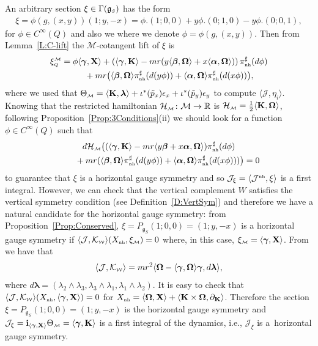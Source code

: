 \documentclass[10pt,a4paper]{amsart}
\numberwithin{equation}{section}
\def\W{\mathcal{W}}
\def\M{\mathcal{M}}
\def\J{\mathcal{J}}
\def\Ham{\mathcal{H}}
\def\R{\mathbb{R}}
\def\g{\mathfrak{g}}
\def\nh{{\mbox{\tiny{nh}}}}
\def\subW{{\mbox{\tiny{$\W$}}}}
\def\subM{{\mbox{\tiny{$\M$}}}}
\def\subSS{{\mbox{\tiny{$S$}}}}
\def\subQQ{{\mbox{\tiny{$Q$}}}}
\def\vecOm{\boldsymbol{\Omega}}
\def\vecL{\boldsymbol{\lambda}}
\def\vecgamma{\boldsymbol{\gamma}}
\def\vecalpha{\boldsymbol{\alpha}}
\def\vecbeta{\boldsymbol{\beta}}
\begin{document}
An arbitrary section $\xi\in \Gamma(\g_\subSS)$ has the form
\begin{gather*}
\xi = \phi(g,(x,y)) (1; y,-x)= \phi.(1;0,0) + y \phi. (0;1,0) - y \phi.(0;0,1),
\end{gather*}
for $\phi\in C^\infty(Q)$ and also we where we denote $\phi = \phi(g,(x,y))$.
Then from Lemma~\ref{L:C-lift} the $\M$-cotangent lift of $\xi$  is
\begin{gather*}
  \xi_\subQQ^\subM =     \phi \langle \vecgamma, {\bf X} \rangle  + \left(  \langle \vecgamma, {\bf K} \rangle -  mr(y \langle \vecbeta,\vecOm\rangle +  x\langle \vecalpha,\vecOm\rangle)  \right) \pi_\nh^\sharp (d\phi) \\
\hphantom{\xi_\subQQ^\subM = }{} + mr \big( \langle \vecbeta,\vecOm\rangle \pi_\nh^\sharp(d(y\phi)) +  \langle \vecalpha,\vecOm\rangle \pi_\nh^\sharp(d(x\phi)) \big),
\end{gather*}
where we used that $\Theta_\subM = \langle {\bf K}, \vecL \rangle + \iota^* (\tilde p_x) \epsilon_x + \iota^*(\tilde p_y) \epsilon_y$ to compute $\langle \J, \eta_i\rangle$.
Knowing that the restricted hamiltonian $\Ham_\subM\colon \M\to \R$ is $\Ham_\subM = \frac{1}{2} \langle {\bf K},  \vecOm \rangle$, following Proposition~\ref{Prop:3Conditions}(ii) we should look for a function $\phi\in C^\infty(Q)$ such that
\begin{gather*}
d\Ham_\subM \big((\langle \vecgamma, {\bf K} \rangle -  mr\langle y\vecbeta + x\vecalpha ,\vecOm\rangle   ) \pi_\nh^\sharp (d\phi)\\
 \qquad{} + mr ( \langle \vecbeta,\vecOm\rangle \pi_\nh^\sharp(d(y\phi)) +  \langle \vecalpha,\vecOm\rangle \pi_\nh^\sharp(d(x\phi)) ) \big) = 0
\end{gather*}
to guarantee that $\xi$ is a horizontal gauge symmetry and so $\J_\xi = \langle \J^\nh, \xi\rangle$ is a f\/irst integral.  However, we can check that the vertical complement $W$ satisf\/ies the vertical symmetry condition (see Def\/inition~\ref{D:VertSym}) and therefore we have a natural candidate for the horizontal gauge symmetry: from Proposition~\ref{Prop:Conserved}, $\xi = P_{\g_S}(1;0,0) = (1; y, -x)$ is a horizontal gauge symmetry if $\langle \mathcal{J},\mathcal{K}_\subW\rangle (X_{\nh}, \xi_\subM )=0$ where, in this case, $\xi_\subM = \langle \vecgamma, {\bf X}\rangle$.  From \cite{Paula} we have that
\begin{gather*}
\langle \J,\mathcal{K}_\subW \rangle = mr^2 \langle \vecOm - \langle \vecgamma,\vecOm \rangle\vecgamma , d\vecL \rangle,
\end{gather*}
where $d\vecL = (\lambda_2\wedge\lambda_3, \lambda_3\wedge\lambda_1, \lambda_1\wedge\lambda_2)$. It is easy to check that $\langle \mathcal{J},\mathcal{K}_\subW\rangle (X_{\nh},\langle \vecgamma, {\bf X} \rangle )=0$ for $X_\nh = \langle \vecOm, {\bf X} \rangle + \langle {\bf K}\times \vecOm , \partial_{\bf K} \rangle$. Therefore the section $\xi = P_{\g_S}(1;0,0) = (1; y, -x)$ is the horizontal gauge symmetry and $\J_\xi = {\bf i}_{\langle \vecgamma, {\bf X} \rangle} \Theta_\subM = \langle \vecgamma, {\bf K} \rangle$ is a f\/irst integral of the dynamics, i.e., $\J_\xi$ is a~horizontal gauge symmetry.
\end{document}
